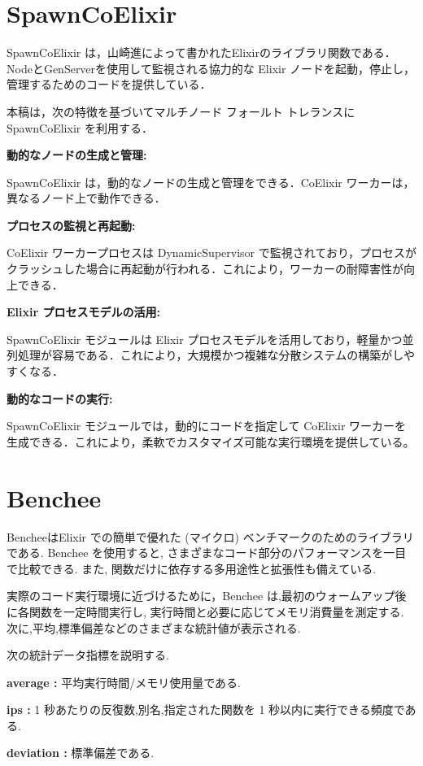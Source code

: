 \documentclass[a4paper]{jreport}	%
\begin{document}
\section{SpawnCoElixir}
SpawnCoElixir は，山崎進によって書かれたElixirのライブラリ関数である．NodeとGenServerを使用して監視される協力的な Elixir ノードを起動，停止し，管理するためのコードを提供している\cite{N}．

本稿は，次の特徴を基づいてマルチノード フォールト トレランスに SpawnCoElixir を利用する．

\textbf{動的なノードの生成と管理:}

SpawnCoElixir は，動的なノードの生成と管理をできる．CoElixir ワーカーは，異なるノード上で動作できる．

\textbf{プロセスの監視と再起動:}

CoElixir ワーカープロセスは DynamicSupervisor で監視されており，プロセスがクラッシュした場合に再起動が行われる．これにより，ワーカーの耐障害性が向上できる．

\textbf{Elixir プロセスモデルの活用:}

SpawnCoElixir モジュールは Elixir プロセスモデルを活用しており，軽量かつ並列処理が容易である．これにより，大規模かつ複雑な分散システムの構築がしやすくなる．

\textbf{動的なコードの実行:}

SpawnCoElixir モジュールでは，動的にコードを指定して CoElixir ワーカーを生成できる．これにより，柔軟でカスタマイズ可能な実行環境を提供している。

\section{Benchee}
BencheeはElixir での簡単で優れた (マイクロ) ベンチマークのためのライブラリである. Benchee を使用すると, さまざまなコード部分のパフォーマンスを一目で比較できる. また, 関数だけに依存する多用途性と拡張性も備えている\cite{O}. 

実際のコード実行環境に近づけるために，Benchee は,最初のウォームアップ後に各関数を一定時間実行し, 実行時間と必要に応じてメモリ消費量を測定する. 次に,平均,標準偏差などのさまざまな統計値が表示される.

次の統計データ指標を説明する.

\textbf{average :} 平均実行時間/メモリ使用量である.

\textbf{ips :} 1 秒あたりの反復数,別名,指定された関数を 1 秒以内に実行できる頻度である.

\textbf{deviation :} 標準偏差である.
\end{document}
